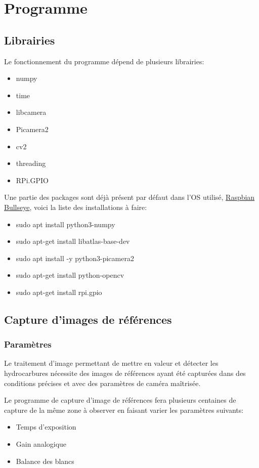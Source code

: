 \section{Programme}
\subsection{Librairies}
Le fonctionnement du programme dépend de plusieurs librairies:
\begin{itemize}
    \item numpy
    \item time
    \item libcamera
    \item Picamera2
    \item cv2
    \item threading
    \item RPi.GPIO
\end{itemize}
Une partie des packages sont déjà présent par défaut dans l'OS utilisé, \underline{Raspbian Bullseye}, voici la liste des installations à faire:
\begin{itemize}
    \item sudo apt install python3-numpy
    \item sudo apt-get install libatlas-base-dev
    \item sudo apt install -y python3-picamera2
    \item sudo apt-get install python-opencv
    \item sudo apt-get install rpi.gpio
\end{itemize}
\subsection{Capture d'images de références}
\subsubsection{Paramètres}
Le traitement d'image permettant de mettre en valeur et détecter les hydrocarbures nécessite des images de références ayant été capturées dans des conditions précises et avec des paramètres de caméra maîtrisée.

Le programme de capture d'image de références fera plusieurs centaines de capture de la même zone à observer en faisant varier les paramètres suivants:
\begin{itemize}
    \item Temps d'exposition
    \item Gain analogique
    \item Balance des blancs
\end{itemize}

